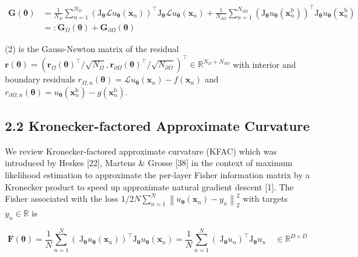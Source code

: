 \documentclass[10pt]{article}
\begin{document}
\begin{align*}
\boldsymbol{G}(\boldsymbol{\theta}) & =\frac{1}{N_{\Omega}} \sum_{n=1}^{N_{\Omega}}\left(\mathrm{J}_{\boldsymbol{\theta}} \mathcal{L} u_{\boldsymbol{\theta}}\left(\boldsymbol{x}_{n}\right)\right)^{\top} \mathrm{J}_{\boldsymbol{\theta}} \mathcal{L} u_{\boldsymbol{\theta}}\left(\boldsymbol{x}_{n}\right)+\frac{1}{N_{\partial \Omega}} \sum_{n=1}^{N_{\partial \Omega}}\left(\mathrm{J}_{\boldsymbol{\theta}} u_{\boldsymbol{\theta}}\left(\boldsymbol{x}_{n}^{\mathrm{b}}\right)\right)^{\top} \mathrm{J}_{\boldsymbol{\theta}} u_{\boldsymbol{\theta}}\left(\boldsymbol{x}_{n}^{\mathrm{b}}\right)  \tag{2}\\
& =: \boldsymbol{G}_{\Omega}(\boldsymbol{\theta})+\boldsymbol{G}_{\partial \Omega}(\boldsymbol{\theta})
\end{align*}


(2) is the Gauss-Newton matrix of the residual $\boldsymbol{r}(\boldsymbol{\theta})=\left(\boldsymbol{r}_{\Omega}(\boldsymbol{\theta})^{\top} / \sqrt{N_{\Omega}}, \boldsymbol{r}_{\partial \Omega}(\boldsymbol{\theta})^{\top} / \sqrt{N_{\partial \Omega}}\right)^{\top} \in \mathbb{R}^{N_{\Omega}+N_{\partial \Omega}}$ with interior and boundary residuals $r_{\Omega, n}(\boldsymbol{\theta})=\mathcal{L} u_{\boldsymbol{\theta}}\left(\boldsymbol{x}_{n}\right)-f\left(\boldsymbol{x}_{n}\right)$ and $r_{\partial \Omega, n}(\boldsymbol{\theta})=u_{\boldsymbol{\theta}}\left(\boldsymbol{x}_{n}^{\mathrm{b}}\right)-g\left(\boldsymbol{x}_{n}^{\mathrm{b}}\right)$.

\subsection*{2.2 Kronecker-factored Approximate Curvature}
We review Kronecker-factored approximate curvature (KFAC) which was introduced by Heskes [22], Martens \& Grosse [38] in the context of maximum likelihood estimation to approximate the per-layer Fisher information matrix by a Kronecker product to speed up approximate natural gradient descent [1]. The Fisher associated with the loss $1 / 2 N \sum_{n=1}^{N}\left\|u_{\boldsymbol{\theta}}\left(\boldsymbol{x}_{n}\right)-y_{n}\right\|_{2}^{2}$ with targets $y_{n} \in \mathbb{R}$ is


\begin{equation*}
\boldsymbol{F}(\boldsymbol{\theta})=\frac{1}{N} \sum_{n=1}^{N}\left(\mathrm{~J}_{\boldsymbol{\theta}} u_{\boldsymbol{\theta}}\left(\boldsymbol{x}_{n}\right)\right)^{\top} \mathrm{J}_{\boldsymbol{\theta}} u_{\boldsymbol{\theta}}\left(\boldsymbol{x}_{n}\right)=\frac{1}{N} \sum_{n=1}^{N}\left(\mathrm{~J}_{\boldsymbol{\theta}} u_{n}\right)^{\top} \mathrm{J}_{\boldsymbol{\theta}} u_{n} \quad \in \mathbb{R}^{D \times D} \tag{3}
\end{equation*}
\end{document}
